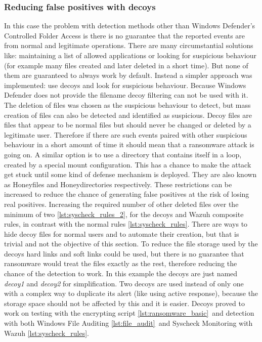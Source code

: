 \subsubsection{Reducing false positives with decoys}
In this case the problem with detection methods other than Windows Defender's Controlled Folder Access is there is no guarantee that the reported events are from normal and legitimate operations.
There are many circumstantial solutions like: maintaining a list of allowed applications or looking for suspicious behaviour (for example many files created and later deleted in a short time).
But none of them are guaranteed to always work by default.
Instead a simpler approach was implemented: use decoys and look for suspicious behaviour.
Because Windows Defender does not provide the filename decoy filtering can not be used with it.
\linej
The deletion of files was chosen as the suspicious behaviour to detect, but mass creation of files can also be detected and identified as suspicious.
\linej
\linej
Decoy files are files that appear to be normal files but should never be changed or deleted by a legitimate user.
Therefore if there are such events paired with other suspicious behaviour in a short amount of time it should mean that a ransomware attack is going on.
\linej
A similar option is to use a directory that contains itself in a loop, created by a special mount configuration.
This has a chance to make the attack get stuck until some kind of defense mechanism is deployed.
They are also known as Honeyfiles and Honeydirectories respectively\cite{ransomware_oReilly}.
\linej
These restrictions can be increased to reduce the chance of generating false positives at the risk of losing real positives.
Increasing the required number of other deleted files over the minimum of two \ref{lst:syscheck_rules_2}, for the decoys and Wazuh composite rules, in contrast with the normal rules \ref{lst:syscheck_rules}.
\linej
There are ways to hide decoy files for normal users and to automate their creation, but that is trivial and not the objective of this section.
To reduce the file storage used by the decoys hard links and soft links could be used, but there is no guarantee that ransomware would treat the files exactly as the rest, therefore reducing the chance of the detection to work.
\linej
In this example the decoys are just named \textit{decoy1} and \textit{decoy2} for simplification.
Two decoys are used instead of only one with a complex way to duplicate its alert (like using active response), because the storage space should not be affected by this and it is easier.
\linej
\linej
Decoys proved to work on testing with the encrypting script \ref{lst:ransomware_basic}\ and detection with both Windows File Auditing \ref{lst:file_audit}\ and Syscheck Monitoring with Wazuh \ref{lst:syscheck_rules}.

